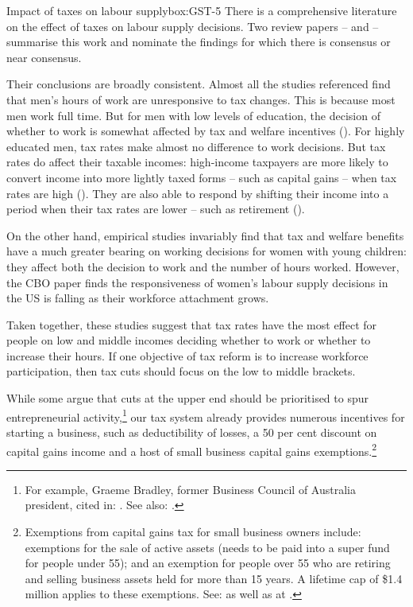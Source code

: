 \begin{smallbox}{Impact of taxes on labour supply}{box:GST-5}
There is a comprehensive literature on the effect of taxes on labour supply decisions. Two review papers – \textcite{MeghirPhillips2008} and \textcite{CBO-2012-Labor-Supply-Elasticity} – summarise this work and nominate the findings for which there is consensus or near consensus.

Their conclusions are broadly consistent. Almost all the studies referenced find that men’s hours of work are unresponsive to tax changes. This is because most men work full time. But for men with low levels of education, the decision of whether to work is somewhat affected by tax and welfare incentives (\textcite{MeghirPhillips2008}). For highly educated men, tax rates make almost no difference to work decisions. But tax rates do affect their taxable incomes: high-income taxpayers are more likely to convert income into more lightly taxed forms – such as capital gains – when tax rates are high (\textcite{MeghirPhillips2008}). They are also able to respond by shifting their income into a period when their tax rates are lower – such as retirement (\textcite{CBO-2012-Labor-Supply-Elasticity}).

On the other hand, empirical studies invariably find that tax and welfare benefits have a much greater bearing on working decisions for women with young children: they affect both the decision to work and the number of hours worked. However, the CBO paper finds the responsiveness of women’s labour supply decisions in the US is falling as their workforce attachment grows.

Taken together, these studies suggest that tax rates have the most effect for people on low and middle incomes deciding whether to work or whether to increase their hours. If one objective of tax reform is to increase workforce participation, then tax cuts should focus on the low to middle brackets.

\end{smallbox}


While some argue that cuts at the upper end should be prioritised to spur entrepreneurial activity,\footnote{For example, Graeme Bradley, former Business Council of Australia president, cited in: \textcite{BaloghHepworth2015}. See also: \textcite{Hockey2015d}.}  our tax system already provides numerous incentives for starting a business, such as deductibility of losses, a 50 per cent discount on capital gains income and a host of small business capital gains exemptions.\footnote{Exemptions from capital gains tax for small business owners include: 
 exemptions for the sale of active assets (needs to be paid into a super fund for people under 55); and an exemption for people over 55 who are retiring and selling business assets held for more than 15 years. A lifetime cap of \$1.4 million applies to these exemptions. See: \textcite{ATO2014f} as well as  at \pageref{paragraph:SUPER-lifetime-CGT-cap}.
}  

